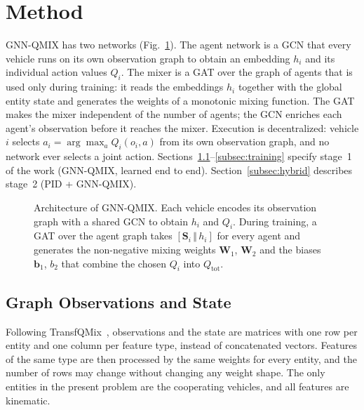 \section{Method}
\label{sec:method}
GNN-QMIX has two networks (Fig.~\ref{fig:architecture}). The agent network is a GCN that
every vehicle runs on its own observation graph to obtain an embedding $h_i$ and its
individual action values $Q_i$. The mixer is a GAT over the graph of agents that is used
only during training: it reads the embeddings $h_i$ together with the global entity state
and generates the weights of a monotonic mixing function. The GAT makes the mixer
independent of the number of agents; the GCN enriches each agent's observation before it
reaches the mixer. Execution is decentralized: vehicle $i$ selects
$a_i = \arg\max_{a} Q_i(o_i,a)$ from its own observation graph, and no network ever selects
a joint action. Sections~\ref{subsec:entities}--\ref{subsec:training} specify stage~1 of
the work (GNN-QMIX, learned end to end). Section~\ref{subsec:hybrid} describes stage~2
(PID + GNN-QMIX).

\begin{figure}[hbt!]
\centering
{}
\caption{\label{fig:architecture} Architecture of GNN-QMIX. Each vehicle encodes its
observation graph with a shared GCN to obtain $h_i$ and $Q_i$. During training, a GAT over
the agent graph takes $[\mathbf{S}_i \,\Vert\, h_i]$ for every agent and generates the
non-negative mixing weights $\mathbf{W}_1$, $\mathbf{W}_2$ and the biases $\mathbf{b}_1$,
$b_2$ that combine the chosen $Q_i$ into $Q_{\text{tot}}$.}
\end{figure}

\subsection{Graph Observations and State}
\label{subsec:entities}
Following TransfQMix~\cite{transfqmix}, observations and the state are matrices with one row
per entity and one column per feature type, instead of concatenated vectors. Features of
the same type are then processed by the same weights for every entity, and the number of
rows may change without changing any weight shape. The only entities in the present
problem are the cooperating vehicles, and all features are kinematic.

